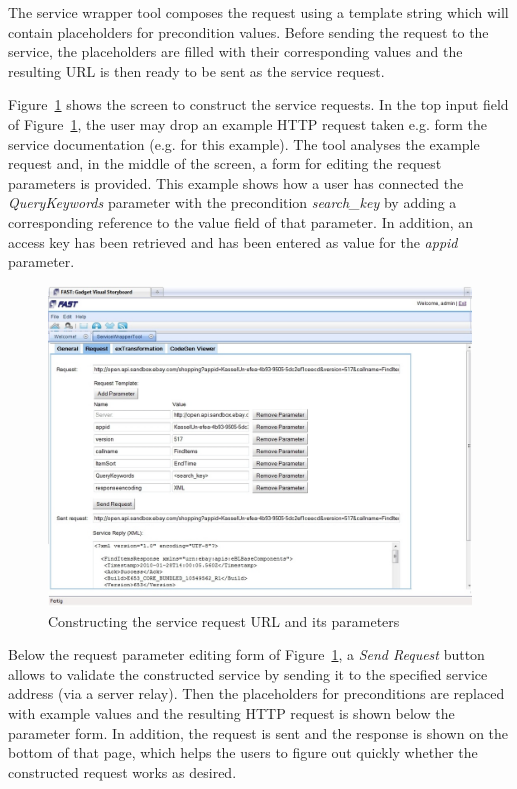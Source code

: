 \documentclass{fast_latex}
\begin{document}
The service wrapper tool composes the request using a template string which will contain placeholders for precondition values. Before sending the request to the service, the placeholders are filled with their corresponding values and the resulting URL is then ready to be sent as the service request.

Figure~\ref{fig:construct_service_request} shows the screen to construct the service requests. In the top input field of Figure~\ref{fig:construct_service_request}, the user may drop an example HTTP request taken e.g. form the service documentation (e.g. \cite{eBayShoppingAPIs} for this example). The tool analyses the example request and, in the middle of the screen, a form for editing the request parameters is provided. This example shows how a user has connected the \textit{QueryKeywords} parameter with the precondition \textit{search\_key} by adding a corresponding reference to the value field of that parameter. In addition, an access key has been retrieved and has been entered as value for the \textit{appid} parameter.

\begin{figure}[!htb]
  \begin{center}
    \includegraphics[width=\linewidth]{images/ServiceWrapperToolGVSWithRequestExample.jpg}
    \caption{Constructing the service request URL and its parameters}
    \label{fig:construct_service_request}
  \end{center}
\end{figure}

Below the request parameter editing form of Figure~\ref{fig:construct_service_request}, a \textit{Send Request} button allows to validate the constructed service by sending it to the specified service address (via a server relay). Then the placeholders for preconditions are replaced with example values and the resulting HTTP request is shown below the parameter form. In addition, the request is sent and the response is shown on the bottom of that page, which helps the users to figure out quickly whether the constructed request works as desired. 
\end{document}
